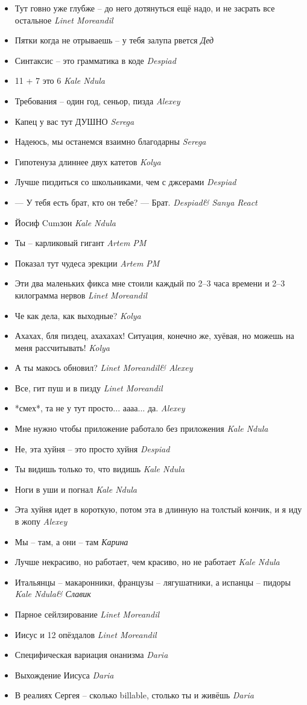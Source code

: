 \documentclass[11pt]{book}
\newcommand{\entry}[2] {\large{\textmd{#1}} \textemdash \small{\emph{#2}}}
\newcommand{\kn}{Kale Ndula}
\newcommand{\lm}{Linet Moreandil}
\newcommand{\dd}{Despiad}
\newcommand{\al}{Alexey}
\newcommand{\se}{Serega}
\newcommand{\nb}{Kolya}
\begin{document}
\begin{itemize}[leftmargin=0cm]
\item \entry{Тут говно уже глубже -- до него дотянуться ещё надо, и не засрать все остальное}{\lm}
\item \entry{Пятки когда не отрываешь -- у тебя залупа рвется}{Дед}
\item \entry{Синтаксис -- это грамматика в коде}{\dd}
\item \entry{11 + 7 это 6}{\kn}
\item \entry{Требования -- один год, сеньор, пизда}{\al}
\item \entry{Капец у вас тут ДУШНО}{\se}
\item \entry{Надеюсь, мы останемся взаимно благодарны}{\se}
\item \entry{Гипотенуза длиннее двух катетов}{\nb}
\item \entry{Лучше пиздиться со школьниками, чем с джсерами}{\dd}
\item \entry{--- У тебя есть брат, кто он тебе? --- Брат.}{\dd \& Sanya React}
\item \entry{Йосиф Cumзон}{\kn}
\item \entry{Ты -- карликовый гигант}{Artem PM}
\item \entry{Показал тут чудеса эрекции}{Artem PM}
\item \entry{Эти два маленьких фикса мне стоили каждый по 2--3 часа времени и 2--3 килограмма нервов}{\lm}
\item \entry{Че как дела, как выходные?}{\nb}
\item \entry{Ахахах, бля пиздец, ахахахах! Ситуация, конечно же, хуёвая, но можешь на меня рассчитывать!}{\nb}
\item \entry{А ты макось обновил?}{\lm \& \al}
\item \entry{Все, гит пуш и в пизду}{\lm}
\item \entry{*смех*, та не у тут просто... аааа... да.}{\al}
\item \entry{Мне нужно чтобы приложение работало без приложения}{\kn}
\item \entry{Не, эта хуйня -- это просто хуйня}{\dd}
\item \entry{Ты видишь только то, что видишь}{\kn}
\item \entry{Ноги в уши и погнал}{\kn}
\item \entry{Эта хуйня идет в короткую, потом эта в длинную на толстый кончик, и я иду в жопу}{\al}
\item \entry{Мы -- там, а они -- там}{Карина}
\item \entry{Лучше некрасиво, но работает, чем красиво, но не работает}{\kn}
\item \entry{Итальянцы -- макаронники, французы -- лягушатники, а испанцы -- пидоры}{\kn \& Славик}
\item \entry{Парное сейлзирование}{\lm}
\item \entry{Иисус и 12 опёздалов}{\lm}
\item \entry{Специфическая вариация онанизма}{Daria}
\item \entry{Выхождение Иисуса}{Daria}
\item \entry{В реалиях Сергея -- сколько billable, столько ты и живёшь}{Daria}

\end{itemize}
\end{document}
